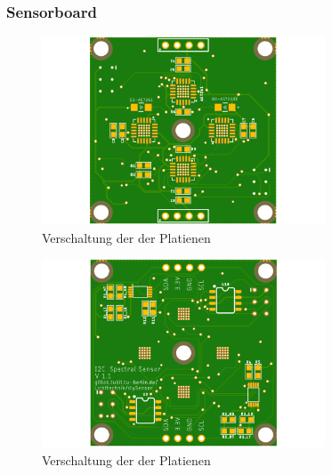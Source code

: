 \subsubsection{Sensorboard}
\begin{figure}[H]
\centering
\includegraphics[width=0.75\textwidth]{img/Sensor-platiene_front}
\caption{Verschaltung der der Platienen}
\label{fig:Seitenasicht-AS726X}
\end{figure}

\begin{figure}[H]
\centering
\includegraphics[width=0.75\textwidth]{img/Sensor-platiene_back}
\caption{Verschaltung der der Platienen}
\label{fig:Seitenasicht-AS726X}
\end{figure}